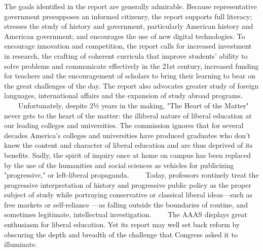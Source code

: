 The goals identified in the report are generally admirable. Because representative government presupposes an informed citizenry, the report supports full literacy; stresses the study of history and government, particularly American history and American government; and encourages the use of new digital technologies. To encourage innovation and competition, the report calls for increased investment in research, the crafting of coherent curricula that improve students' ability to solve problems and communicate effectively in the 21st century, increased funding for teachers and the encouragement of scholars to bring their learning to bear on the great challenges of the day. The report also advocates greater study of foreign languages, international affairs and the expansion of study abroad programs.
　　Unfortunately, despite 2½ years in the making, "The Heart of the Matter" never gets to the heart of the matter: the illiberal nature of liberal education at our leading colleges and universities. The commission ignores that for several decades America's colleges and universities have produced graduates who don't know the content and character of liberal education and are thus deprived of its benefits. Sadly, the spirit of inquiry once at home on campus has been replaced by the use of the humanities and social sciences as vehicles for publicizing "progressive," or left-liberal propaganda.
　　Today, professors routinely treat the progressive interpretation of history and progressive public policy as the proper subject of study while portraying conservative or classical liberal ideas—such as free markets or self-reliance —as falling outside the boundaries of routine, and sometimes legitimate, intellectual investigation.
　　The AAAS displays great enthusiasm for liberal education. Yet its report may well set back reform by obscuring the depth and breadth of the challenge that Congress asked it to illuminate.
